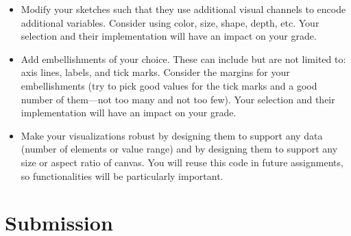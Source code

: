 \documentclass[a4paper,12pt]{article}
\begin{document}
\begin{itemize}




\item Modify your sketches such that they use additional visual channels to encode additional variables. Consider using color, size, shape, depth, etc. Your selection and their implementation will have an impact on your grade.

\item Add embellishments of your choice. These can include but are not limited to: axis lines, labels, and tick marks. Consider the margins for your embellishments (try to pick good values for the tick marks and a good number of them---not too many and not too few). Your selection and their implementation will have an impact on your grade.

\item Make your visualizations robust by designing them to support any data (number of elements or value range) and by designing them to support any size or aspect ratio of canvas. You will reuse this code in future assignments, so functionalities will be particularly important.

\end{itemize}


\section{Submission}



\end{document}
